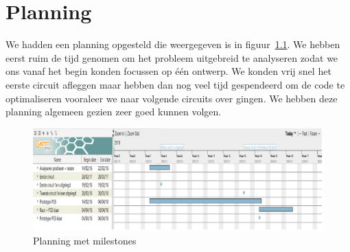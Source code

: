 \chapter{Planning}
We hadden een planning opgesteld die weergegeven is in figuur~\ref{fig:planning}. We hebben eerst ruim de tijd genomen om het probleem uitgebreid te analyseren zodat we ons vanaf het begin konden focussen op \'e\'en ontwerp. We konden vrij snel het eerste circuit afleggen maar hebben dan nog veel tijd gespendeerd om de code te optimaliseren vooraleer we naar volgende circuits over gingen. We hebben deze planning algemeen gezien zeer goed kunnen volgen.
\begin{figure}[h]
\centering
\includegraphics[width=1\textwidth]{planning.png}
\caption{Planning met milestones}
\label{fig:planning}
\end{figure}
